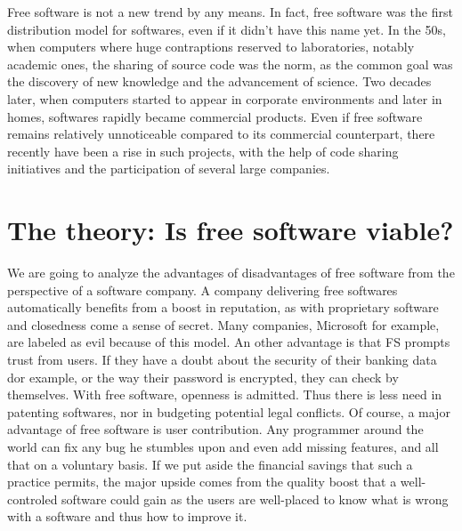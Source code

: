 \documentclass[12pt]{article}
\begin{document}
Free software is not a new trend by any means. In fact, free software
was the first distribution model for softwares, even if it didn't have
this name yet. In the 50s, when computers where huge contraptions
reserved to laboratories, notably academic ones, the sharing of source
code was the norm, as the common goal was the discovery of new knowledge and the
advancement of science. Two decades later, when computers started to
appear in corporate environments and later in homes, softwares rapidly
became commercial products. Even if free software remains relatively unnoticeable
compared to its commercial counterpart, there recently have been a
rise in such projects, with the help of code sharing initiatives and
the participation of several large companies.

\section{The theory: Is free software viable?}

We are going to analyze the advantages of disadvantages of free software from the perspective of 
a software company.
A company delivering free softwares automatically benefits from a
boost in reputation, as with proprietary software and closedness come
a sense of secret. Many companies, Microsoft for example, are labeled
as evil because of this model. An other advantage is that FS prompts
trust from users. If they have a doubt about the security of their
banking data dor example, or the way their password is encrypted, they
can check by themselves. With free software, openness is
admitted. Thus there is less need in patenting softwares,
nor in budgeting potential legal conflicts. Of course, a major
advantage of free software is user contribution. Any programmer around the world
can fix any bug he stumbles upon and even add missing features, and
all that on a voluntary basis. If we put aside the financial savings
that such a practice permits, the major upside comes from the quality
boost that a well-controled software could gain as the users
are well-placed to know what is wrong with a software and thus
how to improve it.
\end{document}
